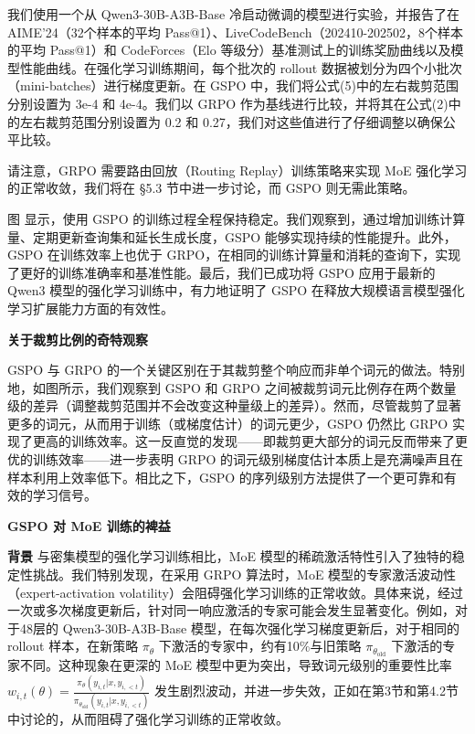 我们使用一个从 Qwen3-30B-A3B-Base 冷启动微调的模型进行实验，并报告了在 AIME'24（32个样本的平均 Pass@1）、LiveCodeBench（202410-202502，8个样本的平均 Pass@1）和 CodeForces（Elo 等级分）基准测试上的训练奖励曲线以及模型性能曲线。在强化学习训练期间，每个批次的 rollout 数据被划分为四个小批次（mini-batches）进行梯度更新。在 GSPO 中，我们将公式(5)中的左右裁剪范围分别设置为 3e-4 和 4e-4。我们以 GRPO 作为基线进行比较，并将其在公式(2)中的左右裁剪范围分别设置为 0.2 和 0.27，我们对这些值进行了仔细调整以确保公平比较。

请注意，GRPO 需要路由回放（Routing Replay）训练策略来实现 MoE 强化学习的正常收敛，我们将在 \S 5.3 节中进一步讨论，而 GSPO 则无需此策略。

图  显示，使用 GSPO 的训练过程全程保持稳定。我们观察到，通过增加训练计算量、定期更新查询集和延长生成长度，GSPO 能够实现持续的性能提升。此外，GSPO 在训练效率上也优于 GRPO，在相同的训练计算量和消耗的查询下，实现了更好的训练准确率和基准性能。最后，我们已成功将 GSPO 应用于最新的 Qwen3 模型的强化学习训练中，有力地证明了 GSPO 在释放大规模语言模型强化学习扩展能力方面的有效性。

\textbf{关于裁剪比例的奇特观察}

GSPO 与 GRPO 的一个关键区别在于其裁剪整个响应而非单个词元的做法。特别地，如图所示，我们观察到 GSPO 和 GRPO 之间被裁剪词元比例存在两个数量级的差异（调整裁剪范围并不会改变这种量级上的差异）。然而，尽管裁剪了显著更多的词元，从而用于训练（或梯度估计）的词元更少，GSPO 仍然比 GRPO 实现了更高的训练效率。这一反直觉的发现——即裁剪更大部分的词元反而带来了更优的训练效率——进一步表明 GRPO 的词元级别梯度估计本质上是充满噪声且在样本利用上效率低下。相比之下，GSPO 的序列级别方法提供了一个更可靠和有效的学习信号。

\textbf{GSPO 对 MoE 训练的裨益}

\textbf{背景} \quad 与密集模型的强化学习训练相比，MoE 模型的稀疏激活特性引入了独特的稳定性挑战。我们特别发现，在采用 GRPO 算法时，MoE 模型的专家激活波动性（expert-activation volatility）会阻碍强化学习训练的正常收敛。具体来说，经过一次或多次梯度更新后，针对同一响应激活的专家可能会发生显著变化。例如，对于48层的 Qwen3-30B-A3B-Base 模型，在每次强化学习梯度更新后，对于相同的 rollout 样本，在新策略 $\pi_\theta$ 下激活的专家中，约有10\%与旧策略 $\pi_{\theta_{\text{old}}}$ 下激活的专家不同。这种现象在更深的 MoE 模型中更为突出，导致词元级别的重要性比率 $w_{i,t}(\theta) = \frac{\pi_\theta(y_{i,t}|x, y_{i,<t})}{\pi_{\theta_{\text{old}}}(y_{i,t}|x, y_{i,<t})}$ 发生剧烈波动，并进一步失效，正如在第3节和第4.2节中讨论的，从而阻碍了强化学习训练的正常收敛。

